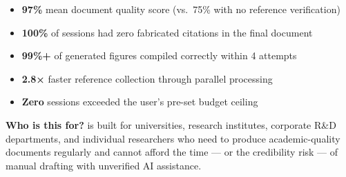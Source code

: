 \begin{statbox}[title=Platform Performance — 120 Evaluated Sessions]
\begin{itemize}[noitemsep]
  \item \textbf{97\%} mean document quality score (vs.\ 75\% with no reference verification)
  \item \textbf{100\%} of sessions had zero fabricated citations in the final document
  \item \textbf{99\%+} of generated figures compiled correctly within 4 attempts
  \item \textbf{2.8×} faster reference collection through parallel processing
  \item \textbf{Zero} sessions exceeded the user's pre-set budget ceiling
\end{itemize}
\end{statbox}

\textbf{Who is this for?}
\sys{} is built for universities, research institutes, corporate R\&D departments,
and individual researchers who need to produce academic-quality documents regularly
and cannot afford the time — or the credibility risk — of manual drafting with
unverified AI assistance.
